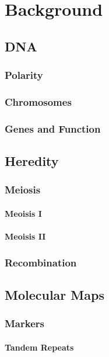 \chapter{Background}

\section{DNA}

\subsection{Polarity}
\subsection{Chromosomes}
\subsection{Genes and Function}


\section{Heredity}

\subsection{Meiosis}
\subsubsection{Meoisis I}
\subsubsection{Meoisis II}
\subsection{Recombination}


\section{Molecular Maps}

\subsection{Markers}
\subsubsection{Tandem Repeats}
